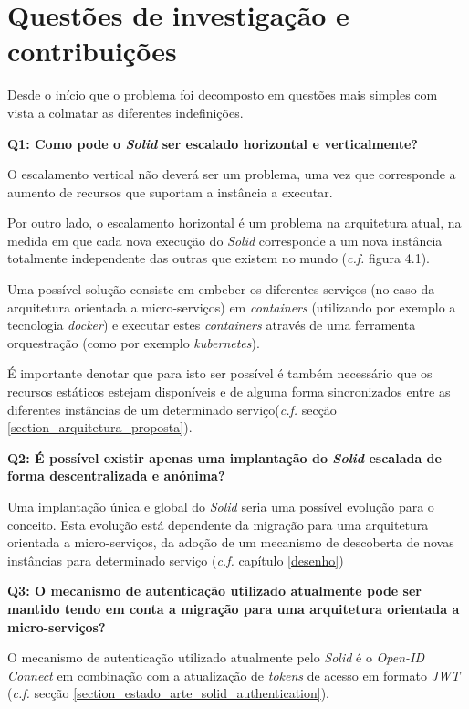 \section{Questões de investigação e contribuições}
Desde o início que o problema foi decomposto em questões mais simples com vista a colmatar as diferentes indefinições.

\newhalfpara

\textbf{Q1: {Como pode o \emph{Solid} ser escalado horizontal e verticalmente?}}

O escalamento vertical não deverá ser um problema, uma vez que corresponde a aumento de recursos que suportam a instância a executar.

Por outro lado, o escalamento horizontal é um problema na arquitetura atual, na medida em que cada nova execução do \emph{Solid} corresponde a um nova instância totalmente independente das outras que existem no mundo (\emph{c.f.} figura 4.1).

Uma possível solução consiste em embeber os diferentes serviços (no caso da arquitetura orientada a micro-serviços) em \emph{containers} (utilizando por exemplo a tecnologia \emph{docker}) e executar estes \emph{containers} através de uma ferramenta orquestração (como por exemplo \emph{kubernetes}).

É importante denotar que para isto ser possível é também necessário que os recursos estáticos estejam disponíveis e de alguma forma sincronizados entre as diferentes instâncias de um determinado serviço(\emph{c.f.} secção \ref{section_arquitetura_proposta}).

\newhalfpara

\textbf{Q2: É possível existir apenas uma implantação do \emph{Solid} escalada de forma descentralizada e anónima?}

Uma implantação única e global do \emph{Solid} seria uma possível evolução para o conceito. Esta evolução está dependente da migração para uma arquitetura orientada a micro-serviços, da adoção de um mecanismo de descoberta de novas instâncias para determinado serviço (\emph{c.f.} capítulo \ref{desenho})

\newhalfpara

\textbf{Q3: O mecanismo de autenticação utilizado atualmente pode ser mantido tendo em conta a migração para uma arquitetura orientada a micro-serviços?}

O mecanismo de autenticação utilizado atualmente pelo \emph{Solid} é o \emph{Open-ID Connect} em combinação com a atualização de \emph{tokens} de acesso em formato \emph{\acrshort{JWT}} (\emph{c.f.} secção \ref{section_estado_arte_solid_authentication}).

